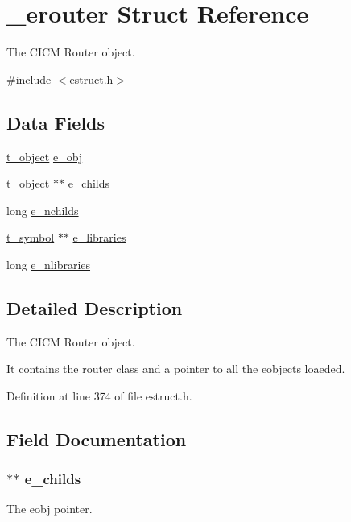 \hypertarget{struct__erouter}{\section{\-\_\-erouter Struct Reference}
\label{struct__erouter}
}


The C\-I\-C\-M Router object.  




{\ttfamily \#include $<$estruct.\-h$>$}

\subsection*{Data Fields}
\begin{DoxyCompactItemize}
\item 
\hyperlink{struct__text}{t\-\_\-object} \hyperlink{struct__erouter_a337dd8dd1771ebe57e90886d4fdfe92d}{e\-\_\-obj}
\item 
\hyperlink{struct__text}{t\-\_\-object} $\ast$$\ast$ \hyperlink{struct__erouter_a5484fdcb775740c1c4dedcd94b4580ab}{e\-\_\-childs}
\item 
long \hyperlink{struct__erouter_aae6cef9e2d4de46e690ad868953d0923}{e\-\_\-nchilds}
\item 
\hyperlink{struct__symbol}{t\-\_\-symbol} $\ast$$\ast$ \hyperlink{struct__erouter_ad4cb6c25f09dfe6806fde606969accd5}{e\-\_\-libraries}
\item 
long \hyperlink{struct__erouter_a8b3fb033a6ba10fb08f5353a71dec2c7}{e\-\_\-nlibraries}
\end{DoxyCompactItemize}


\subsection{Detailed Description}
The C\-I\-C\-M Router object. 

It contains the router class and a pointer to all the eobjects loaeded. 

Definition at line 374 of file estruct.\-h.



\subsection{Field Documentation}
\hypertarget{struct__erouter_a5484fdcb775740c1c4dedcd94b4580ab}{
\subsubsection[{e\-\_\-childs}]{$\ast$$\ast$ e\-\_\-childs}}\label{struct__erouter_a5484fdcb775740c1c4dedcd94b4580ab}
The eobj pointer. 

